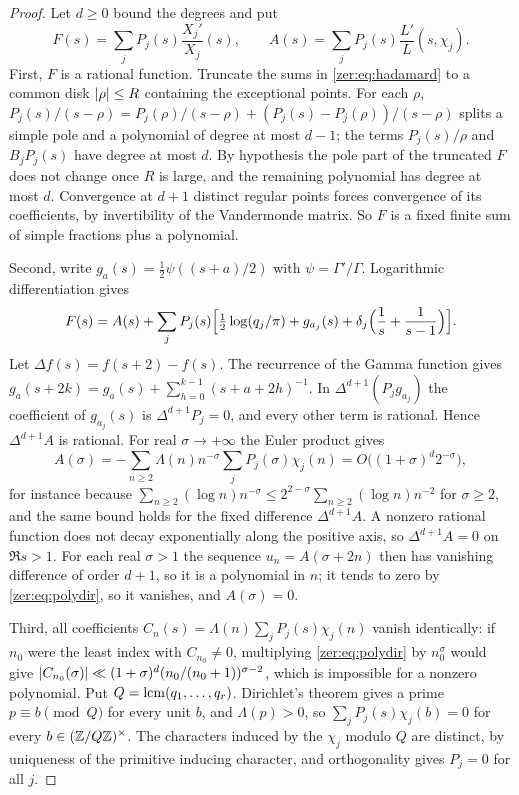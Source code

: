 \begin{proof}
Let $d\ge0$ bound the degrees and put
\[
 F(s)=\sum_jP_j(s)\frac{X_j'}{X_j}(s),\qquad A(s)=\sum_jP_j(s)\frac{L'}{L}(s,\chi_j).
\]
First, $F$ is a rational function. Truncate the sums in \eqref{zer:eq:hadamard} to a common
disk $\lvert\rho\rvert\le R$ containing the exceptional points. For each $\rho$,
$P_j(s)/(s-\rho)=P_j(\rho)/(s-\rho)+(P_j(s)-P_j(\rho))/(s-\rho)$ splits a simple pole and a
polynomial of degree at most $d-1$; the terms $P_j(s)/\rho$ and $B_jP_j(s)$ have degree at most
$d$. By hypothesis the pole part of the truncated $F$ does not change once $R$ is large, and the
remaining polynomial has degree at most $d$. Convergence at $d+1$ distinct regular points forces
convergence of its coefficients, by invertibility of the Vandermonde matrix. So $F$ is a fixed
finite sum of simple fractions plus a polynomial.

Second, write $g_a(s)=\tfrac12\psi((s+a)/2)$ with $\psi=\Gamma'/\Gamma$. Logarithmic
differentiation gives
\[
 F(s)=A(s)+\sum_jP_j(s)\Bigl[\tfrac12\log(q_j/\pi)+g_{a_j}(s)
 +\delta_j\Bigl(\frac1s+\frac1{s-1}\Bigr)\Bigr].
\]
Let $\Delta f(s)=f(s+2)-f(s)$. The recurrence of the Gamma function gives
$g_a(s+2k)=g_a(s)+\sum_{h=0}^{k-1}(s+a+2h)^{-1}$. In $\Delta^{d+1}(P_jg_{a_j})$ the
coefficient of $g_{a_j}(s)$ is $\Delta^{d+1}P_j=0$, and every other term is rational. Hence
$\Delta^{d+1}A$ is rational. For real $\sigma\to+\infty$ the Euler product gives
\begin{equation}\label{zer:eq:polydir}
 A(\sigma)=-\sum_{n\ge2}\Lambda(n)n^{-\sigma}\sum_jP_j(\sigma)\chi_j(n)
 =O\bigl((1+\sigma)^d2^{-\sigma}\bigr),
\end{equation}
for instance because $\sum_{n\ge2}(\log n)n^{-\sigma}\le2^{2-\sigma}\sum_{n\ge2}(\log n)n^{-2}$
for $\sigma\ge2$, and the same bound holds for the fixed difference $\Delta^{d+1}A$. A nonzero
rational function does not decay exponentially along the positive axis, so $\Delta^{d+1}A=0$ on
$\Re s>1$. For each real $\sigma>1$ the sequence $u_n=A(\sigma+2n)$ then has vanishing
difference of order $d+1$, so it is a polynomial in $n$; it tends to zero by
\eqref{zer:eq:polydir}, so it vanishes, and $A(\sigma)=0$.

Third, all coefficients $C_n(s)=\Lambda(n)\sum_jP_j(s)\chi_j(n)$ vanish identically: if $n_0$
were the least index with $C_{n_0}\ne0$, multiplying \eqref{zer:eq:polydir} by $n_0^\sigma$
would give $\lvert C_{n_0}(\sigma)\rvert\ll(1+\sigma)^d(n_0/(n_0+1))^{\sigma-2}$, which is impossible
for a nonzero polynomial. Put $Q=\operatorname{lcm}(q_1,\dots,q_r)$. Dirichlet's theorem gives a prime
$p\equiv b\pmod Q$ for every unit $b$, and $\Lambda(p)>0$, so $\sum_jP_j(s)\chi_j(b)=0$ for
every $b\in(\mathbb{Z}/Q\mathbb{Z})^\times$. The characters induced by the $\chi_j$ modulo $Q$ are distinct, by
uniqueness of the primitive inducing character, and orthogonality gives $P_j=0$ for all $j$.
\end{proof}

